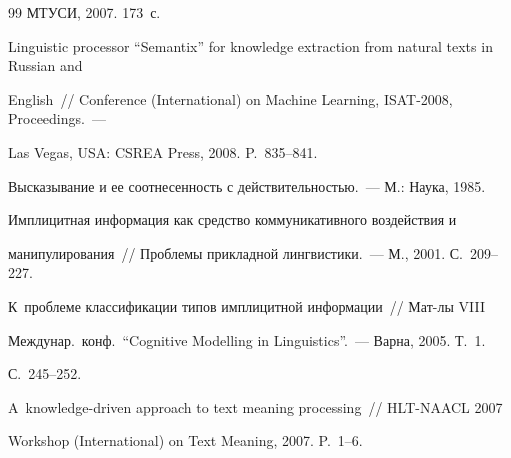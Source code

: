 {{\begin{thebibliography}{99}
МТУСИ, 2007. 173~с.









Linguistic processor ``Semantix'' for knowledge extraction from natural texts  in Russian and 


English~/\!\!/ Conference (International) on Machine Learning, ISAT-2008, Proceedings.~--- 


Las Vegas, USA: CSREA Press, 2008. P.~835--841.







 Высказывание и ее соотнесенность с действительностью.~--- М.: Наука, 1985.









Имплицитная информация как средство коммуникативного воздействия и 


манипулирования~/\!\!/ Проблемы прикладной лингвистики.~--- М., 2001. С.~209--227.












К~проблеме классификации типов имплицитной информации~/\!\!/ Мат-лы VIII 


Междунар.\ конф.\ ``Cognitive Modelling in Linguistics''.~--- Варна, 2005. Т.~1. 


С.~245--252.









 A~knowledge-driven approach to text meaning processing~/\!\!/ HLT-NAACL 2007 


Workshop (International) on Text Meaning, 2007. P.~1--6.













\end{thebibliography}}}
